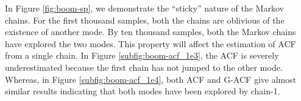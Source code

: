 \documentclass[11pt]{article}
\theoremstyle{remark}
\begin{document}

%
In Figure \ref{fig:boom-sp}, we demonstrate the ``sticky'' nature of the Markov chains. For the first thousand samples, both the chains are oblivious of the existence of another mode. By ten thousand samples, both the Markov chains have explored the two modes. This property will affect the estimation of ACF from a single chain. In Figure \ref{subfig:boom-acf_1e3}, the ACF is severely underestimated because the first chain has not jumped to the other mode. Whereas, in Figure \ref{subfig:boom-acf_1e4}, both ACF and G-ACF give almost similar results indicating that both modes have been explored by chain-1. 
\end{document}
